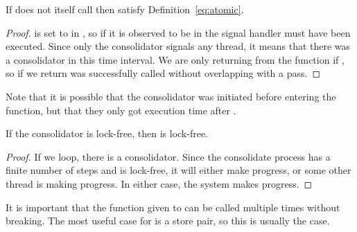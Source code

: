 \begin{theorem}
  If  does not itself call  then  satisfy
  Definition~\ref{eq:atomic}.
\end{theorem}
\begin{proof}
   is set to  in , so if it is observed to be
   in  the signal handler must have been executed. Since only the consolidator
  signals any thread, it means that there was a consolidator in this time interval. We are only
  returning from the function if , so if we return  was
  successfully called without overlapping with a pass.
\end{proof}
Note that it is possible that the consolidator was initiated before entering the 
function, but that they only got execution time after .
\begin{lemma}
  If the consolidator is lock-free, then  is lock-free.
\end{lemma}
\begin{proof}
  If we loop, there is a consolidator. Since the consolidate process has a finite number of steps
  and is lock-free, it will either make progress, or some other thread is making progress. In
  either case, the system makes progress.
\end{proof}

It is important that the function given to  can be called multiple times without
breaking. The most useful case for  is a  store pair, so this is
usually the case.

